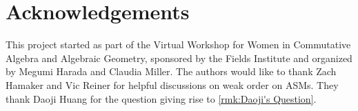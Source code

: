 \documentclass[12 pt]{amsart}
\numberwithin{equation}{section}
\theoremstyle{remark}
\begin{document}
\section*{Acknowledgements}

This project started as part of the Virtual Workshop for Women in Commutative Algebra and Algebraic Geometry, sponsored by the Fields Institute and organized by Megumi Harada and Claudia Miller. The authors would like to thank Zach Hamaker and Vic Reiner for helpful discussions on weak order on ASMs. They thank Daoji Huang for the question giving rise to \cref{rmk:Daoji's Question}.

 

\end{document}
